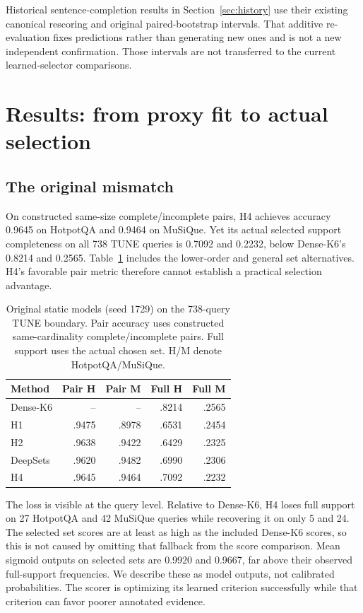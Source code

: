 \documentclass[pdflatex,sn-mathphys-num]{sn-jnl}
\begin{document}
Historical sentence-completion results in Section~\ref{sec:history} use
their existing canonical rescoring and original paired-bootstrap intervals.
That additive re-evaluation fixes predictions rather than generating new
ones and is not a new independent confirmation. Those intervals are not
transferred to the current learned-selector comparisons.

\section{Results: from proxy fit to actual selection}
\subsection{The original mismatch}
On constructed same-size complete/incomplete pairs, H4 achieves accuracy
0.9645 on HotpotQA and 0.9464 on MuSiQue. Yet its actual selected support
completeness on all 738 TUNE queries is 0.7092 and 0.2232, below Dense-K6's
0.8214 and 0.2565. Table~\ref{tab:static} includes the lower-order and general
set alternatives. H4's favorable pair metric therefore cannot establish a
practical selection advantage.

\begin{table}[t]\centering
\caption{Original static models (seed 1729) on the 738-query TUNE boundary. Pair accuracy
uses constructed same-cardinality complete/incomplete pairs. Full support
uses the actual chosen set. H/M denote HotpotQA/MuSiQue.}
\label{tab:static}
\begin{tabular}{lrrrr}\toprule
Method & Pair H & Pair M & Full H & Full M\\\midrule
Dense-K6 & -- & -- & .8214 & .2565\\
H1 & .9475 & .8978 & .6531 & .2454\\
H2 & .9638 & .9422 & .6429 & .2325\\
DeepSets & .9620 & .9482 & .6990 & .2306\\
H4 & .9645 & .9464 & .7092 & .2232\\\bottomrule
\end{tabular}
\end{table}

The loss is visible at the query level. Relative to Dense-K6, H4 loses full
support on 27 HotpotQA and 42 MuSiQue queries while recovering it on only
5 and 24. The selected set scores are at least as high as the included
Dense-K6 scores, so this is not caused by omitting that fallback from the
score comparison. Mean sigmoid outputs on selected sets are 0.9920 and
0.9667, far above their observed full-support frequencies. We describe these
as model outputs, not calibrated probabilities. The scorer is optimizing
its learned criterion successfully while that criterion can favor poorer
annotated evidence.
\end{document}
